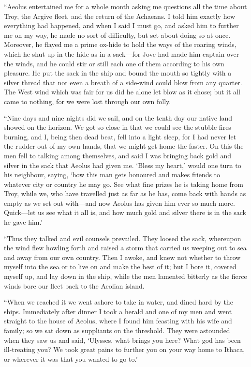 “Aeolus entertained me for a whole month asking me questions all the time about
Troy, the Argive fleet, and the return of the Achaeans. I told him exactly how
everything had happened, and when I said I must go, and asked him to further me
on my way, he made no sort of difficulty, but set about doing so at once.
Moreover, he flayed me a prime ox-hide to hold the ways of the roaring winds,
which he shut up in the hide as in a sack—for Jove had made him captain over
the winds, and he could stir or still each one of them according to his own
pleasure. He put the sack in the ship and bound the mouth so tightly with a
silver thread that not even a breath of a side-wind could blow from any
quarter. The West wind which was fair for us did he alone let blow as it chose;
but it all came to nothing, for we were lost through our own folly.

“Nine days and nine nights did we sail, and on the tenth day our native land
showed on the horizon. We got so close in that we could see the stubble fires
burning, and I, being then dead beat, fell into a light sleep, for I had never
let the rudder out of my own hands, that we might get home the faster. On this
the men fell to talking among themselves, and said I was bringing back gold and
silver in the sack that Aeolus had given me. ‘Bless my heart,’ would one turn
to his neighbour, saying, ‘how this man gets honoured and makes friends to
whatever city or country he may go. See what fine prizes he is taking home from
Troy, while we, who have travelled just as far as he has, come back with hands
as empty as we set out with—and now Aeolus has given him ever so much more.
Quick—let us see what it all is, and how much gold and silver there is in the
sack he gave him.’

“Thus they talked and evil counsels prevailed. They loosed the sack, whereupon
the wind flew howling forth and raised a storm that carried us weeping out to
sea and away from our own country. Then I awoke, and knew not whether to throw
myself into the sea or to live on and make the best of it; but I bore it,
covered myself up, and lay down in the ship, while the men lamented bitterly as
the fierce winds bore our fleet back to the Aeolian island.

“When we reached it we went ashore to take in water, and dined hard by the
ships. Immediately after dinner I took a herald and one of my men and went
straight to the house of Aeolus, where I found him feasting with his wife and
family; so we sat down as suppliants on the threshold. They were astounded when
they saw us and said, ‘Ulysses, what brings you here? What god has been
ill-treating you? We took great pains to further you on your way home to
Ithaca, or wherever it was that you wanted to go to.’

